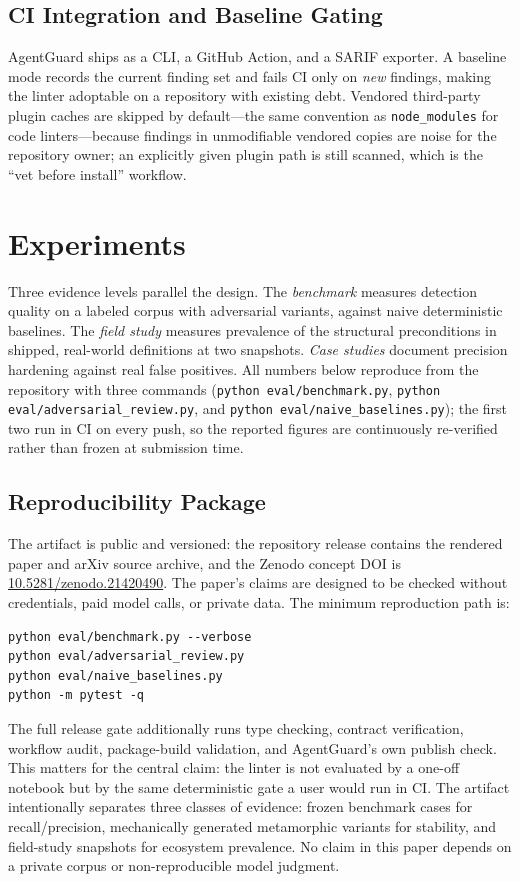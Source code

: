 \documentclass[11pt]{article}
\begin{document}
\subsection{CI Integration and Baseline Gating}
AgentGuard ships as a CLI, a GitHub Action, and a SARIF exporter. A baseline mode records the
current finding set and fails CI only on \emph{new} findings, making the linter adoptable on a
repository with existing debt. Vendored third-party plugin caches are skipped by default---the
same convention as \texttt{node\_modules} for code linters---because findings in unmodifiable
vendored copies are noise for the repository owner; an explicitly given plugin path is still
scanned, which is the ``vet before install'' workflow.
\section{Experiments}
Three evidence levels parallel the design. The \emph{benchmark} measures detection quality on a
labeled corpus with adversarial variants, against naive deterministic baselines. The \emph{field
study} measures prevalence of the structural preconditions in shipped, real-world definitions at
two snapshots. \emph{Case studies} document precision hardening against real false positives. All
numbers below reproduce from the repository with three commands (\texttt{python
eval/benchmark.py}, \texttt{python eval/adversarial\_review.py}, and \texttt{python
eval/naive\_baselines.py}); the first two run in CI on every push, so the reported figures are
continuously re-verified rather than frozen at submission time.

\subsection{Reproducibility Package}
\label{sec:repro}
The artifact is public and versioned: the repository release contains the rendered paper and arXiv
source archive, and the Zenodo concept DOI is
\href{https://doi.org/10.5281/zenodo.21420490}{10.5281/zenodo.21420490}. The paper's claims are
designed to be checked without credentials, paid model calls, or private data. The minimum
reproduction path is:
\begin{verbatim}
python eval/benchmark.py --verbose
python eval/adversarial_review.py
python eval/naive_baselines.py
python -m pytest -q
\end{verbatim}
The full release gate additionally runs type checking, contract verification, workflow audit,
package-build validation, and AgentGuard's own publish check. This matters for the central claim:
the linter is not evaluated by a one-off notebook but by the same deterministic gate a user would
run in CI. The artifact intentionally separates three classes of evidence: frozen benchmark cases
for recall/precision, mechanically generated metamorphic variants for stability, and field-study
snapshots for ecosystem prevalence. No claim in this paper depends on a private corpus or
non-reproducible model judgment.
\end{document}
